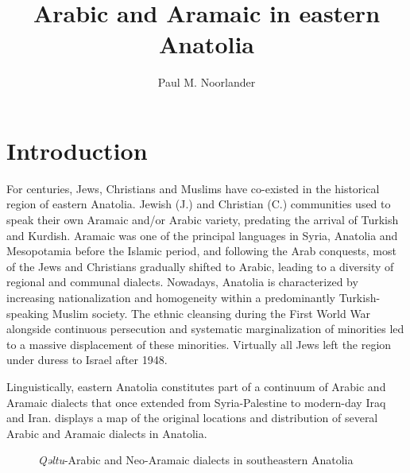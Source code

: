 \documentclass[output=paper,colorlinks,citecolor=brown,draftmode]{langscibook}
\author{Paul M. Noorlander\orcid{0000-0002-9407-1453}\affiliation{University of Cambridge}}
\title{Arabic and Aramaic in eastern Anatolia}
\begin{document}
\maketitle\label{WOWA:ch:16}

\section{Introduction}

For centuries, Jews, Christians and Muslims have co-existed in the historical region of eastern Anatolia. Jewish (J.) and Christian (C.) communities used to speak their own Aramaic and/or Arabic variety, predating the arrival of Turkish and Kurdish. Aramaic was one of the principal languages in Syria, Anatolia and Mesopotamia before the Islamic period, and following the Arab conquests, most of the Jews and Christians gradually shifted to Arabic, leading to a diversity of regional and communal dialects. Nowadays, Anatolia is characterized by increasing nationalization and homogeneity within a predominantly Turkish-speaking Muslim society. The ethnic cleansing during the First World War alongside continuous persecution and systematic marginalization of minorities led to a massive displacement of these minorities. Virtually all Jews left the region under duress to Israel after 1948.

Linguistically, eastern Anatolia constitutes part of a continuum of Arabic and Aramaic dialects that once extended from Syria-Palestine to modern-day Iraq and Iran.  displays a map of the original locations and distribution of several Arabic and Aramaic dialects in Anatolia.

\begin{figure}
    {%
    \setlength{\fboxsep}{0pt}%
    \setlength{\fboxrule}{1pt}%
    }%
    \caption{\textit{Qəltu}-Arabic and Neo-Aramaic dialects in southeastern Anatolia}
    \label{Arabic:fig:1}
\end{figure}
\end{document}
